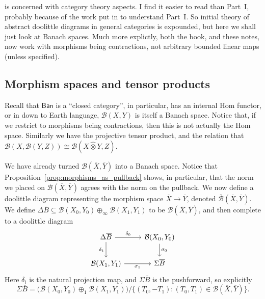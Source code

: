 \documentclass[a4paper,11pt]{article}
\theoremstyle{plain}
\theoremstyle{remark}
\newcommand{\mc}[1]{\mathcal{#1}}
\newcommand{\msf}[1]{\mathsf{#1}}
\newcommand{\proten}{\widehat\otimes}
\begin{document}
\cite[Part~II]{KP_InterpolationFunctorsDuality} is concerned with category theory aspects.  I find it easier to read than Part~I, probably because of the work put in to understand Part~I.  So initial theory of abstract doolittle diagrams in general categories is expounded, but here we shall just look at Banach spaces.  Much more explictly, both the book, and these notes, now work with morphisms being contractions, not arbitrary bounded linear maps (unless specified).

\subsection{Morphism spaces and tensor products}

Recall that $\msf{Ban}$ is a ``closed category'', in particular, has an internal Hom functor, or in down to Earth language, $\mc B(X,Y)$ is itself a Banach space.  Notice that, if we restrict to morphisms being contractions, then this is not actually the Hom space.  Similarly we have the projective tensor product, and the relation that $\mc B(X, \mc B(Y,Z)) \cong \mc B(X\proten Y, Z)$.

We have already turned $\mc B(\overline X,\overline Y)$ into a Banach space.  Notice that Proposition~\ref{prop:morphisms_as_pullback} shows, in particular, that the norm we placed on $\mc B(\overline X, \overline Y)$ agrees with the norm on the pullback.  We now define a doolittle diagram representing the morphism space $\overline X \to \overline Y$, denoted $\overline{\mc B}(\overline X,\overline Y)$.  We define $\Delta\overline B \subseteq \mc B(X_0,Y_0) \oplus_\infty \mc B(X_1, Y_1)$ to be $\mc B(\overline X, \overline Y)$, and then complete to a doolittle diagram
\[ \begin{tikzcd}
\Delta\overline B \arrow[r, "\delta_0"] \arrow[d, "\delta_1"'] & \mc B(X_0,Y_0) \arrow[d, "\sigma_0"] \\
\mc B(X_1,Y_1) \arrow[r, "\sigma_1"'] & \Sigma\overline B
\end{tikzcd} \]
Here $\delta_i$ is the natural projection map, and $\Sigma\overline B$ is the pushforward, so explicitly
\[ \Sigma\overline B = \big( \mc B(X_0,Y_0) \oplus_1 \mc B(X_1,Y_1) \big)
/ \{ (T_0, -T_1) :  (T_0, T_1) \in \mc B(\overline X, \overline Y) \}. \]
\end{document}
